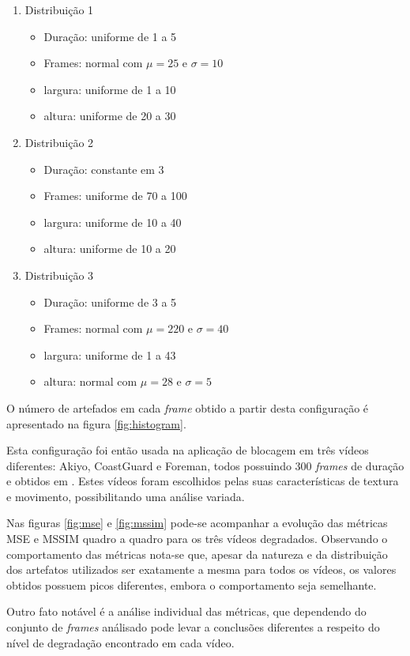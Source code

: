 \begin{enumerate}
	\item Distribuição 1
	\begin{itemize}
		\item Duração: uniforme de 1 a 5
		\item Frames: normal com \(\mu = 25\) e \(\sigma = 10\)
		\item largura: uniforme de 1 a 10
		\item altura: uniforme de 20 a 30
	\end{itemize}
	\item Distribuição 2
	\begin{itemize}
		\item Duração: constante em 3
		\item Frames: uniforme de 70 a 100
		\item largura: uniforme de 10 a 40
		\item altura: uniforme de 10 a 20
	\end{itemize}
	\item Distribuição 3
	\begin{itemize}
		\item Duração: uniforme de 3 a 5
		\item Frames: normal com \(\mu = 220\) e \(\sigma = 40\)
		\item largura: uniforme de 1 a 43
		\item altura: normal com \(\mu = 28\) e \(\sigma = 5\)
	\end{itemize}
\end{enumerate}

O número de artefados em cada \emph{frame} obtido a partir desta configuração é apresentado na figura \ref{fig:histogram}.

Esta configuração foi então usada na aplicação de blocagem em três vídeos diferentes: Akiyo, CoastGuard e Foreman, todos possuindo 300 \emph{frames} de duração e obtidos em \cite{xiph}. Estes vídeos foram escolhidos pelas suas características de textura e movimento, possibilitando uma análise variada.

Nas figuras \ref{fig:mse} e \ref{fig:mssim} pode-se acompanhar a evolução das métricas MSE e MSSIM quadro a quadro para os três vídeos degradados. Observando o comportamento das métricas nota-se que, apesar da natureza e da distribuição dos artefatos utilizados ser exatamente a mesma para todos os vídeos, os valores obtidos possuem picos diferentes, embora o comportamento seja semelhante.

Outro fato notável é a análise individual das métricas, que dependendo do conjunto de \emph{frames} análisado pode levar a conclusões diferentes a respeito do nível de degradação encontrado em cada vídeo.

